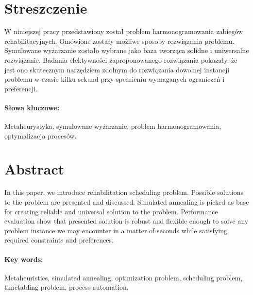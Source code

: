 \section*{Streszczenie}
W niniejszej pracy przedstawiony został problem harmonogramowania zabiegów
rehabilitacyjnych. Omówione zostały możliwe sposoby rozwiązania problemu.
Symulowane wyżarzanie zostało wybrane jako baza tworząca solidne i uniwersalne rozwiązanie.
Badania efektywności zaproponowanego rozwiązania pokazały, że jest ono
skutecznym narzędziem zdolnym do rozwiązania dowolnej instancji problemu w
czasie kilku sekund przy spełnieniu wymaganych ograniczeń i preferencji.

\paragraph{Słowa kluczowe:} Metaheurystyka, symulowane wyżarzanie, problem harmonogramowania, optymalizacja procesów.

\section*{Abstract}
In this paper, we introduce rehabilitation scheduling problem.
Possible solutions to the problem are presented and discussed.
Simulated annealing is picked as
base for creating reliable and universal solution to the problem. Performance evaluation
show that presented solution is robust and flexible enough to solve any
problem instance we may encounter in a matter of seconds while satisfying required
constraints and preferences.

\paragraph{Key words:} Metaheuristics, simulated annealing, optimization problem, scheduling problem, timetabling problem, process automation.
